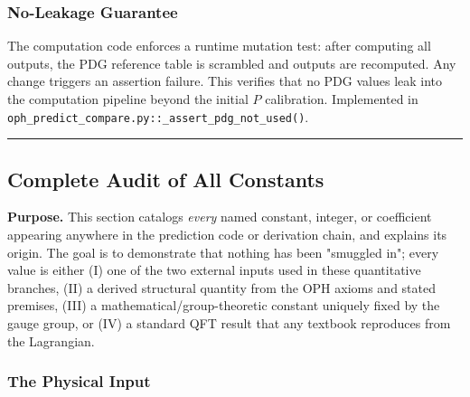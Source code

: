 \subsubsection{No-Leakage Guarantee}\label{13-no-leakage-guarantee}

The computation code enforces a runtime mutation test: after computing all outputs, the PDG reference table is scrambled and outputs are recomputed. Any change triggers an assertion failure. This verifies that no PDG values leak into the computation pipeline beyond the initial \(P\) calibration. Implemented in \texttt{oph\_predict\_compare.py::\_assert\_pdg\_not\_used()}.

\begin{center}\rule{0.5\linewidth}{0.5pt}\end{center}

\subsection{Complete Audit of All Constants}\label{1a-complete-audit-of-all-constants}

\textbf{Purpose.} This section catalogs \emph{every} named constant, integer, or coefficient appearing anywhere in the prediction code or derivation chain, and explains its origin. The goal is to demonstrate that nothing has been "smuggled in"; every value is either (I) one of the two external inputs used in these quantitative branches, (II) a derived structural quantity from the OPH axioms and stated premises, (III) a mathematical/group-theoretic constant uniquely fixed by the gauge group, or (IV) a standard QFT result that any textbook reproduces from the Lagrangian.

\subsubsection{The Physical Input}\label{1a1-the-physical-input}

